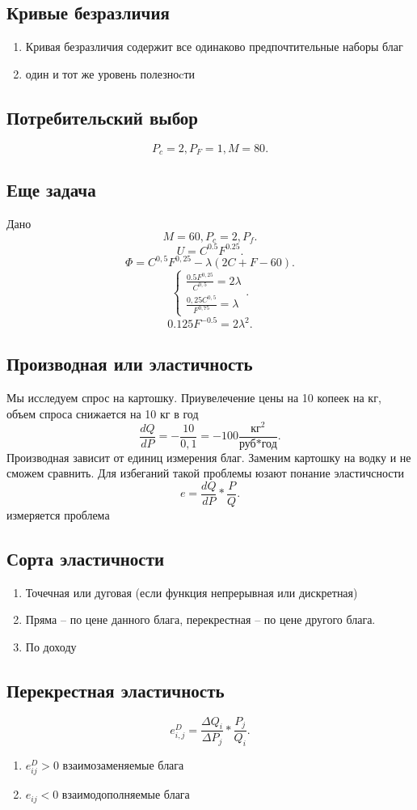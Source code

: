 \documentclass[14pt]{extarticle}
\begin{document}
\subsection{Кривые безразличия}
\begin{enumerate}
    \item Кривая безразличия содержит все одинаково предпочтительные наборы благ
    \item один и тот же уровень полезноcти
\end{enumerate}
\subsection{Потребительский выбор}
\[
P_{c} = 2, P_{F} = 1, M = 80
.\] 
\subsection{Еще задача}
Дано
\[
M = 60 , P_{c} = 2, P_{f}
.\] 
\[
U = C^{0.5}F^{0.25}
.\] 
\[
\Phi = C^{0,5} F^{0,25} - \lambda(2C +F - 60)
.\] 
\[
    \begin{cases}
        \frac{0.5 F ^{0,25}}{C^{0,5}} = 2\lambda\\
        \frac{0,25 C^{0,5}}{F^{0,75}}= \lambda
    \end{cases}
.\] 
\[
    0.125 F^{-0.5} = 2 \lambda^2
.\] 
\subsection{Производная или эластичность}
Мы исследуем спрос на картошку. Приувелечение цены на 10 копеек на кг, объем спроса снижается на 10 кг в год
\[
    \frac{dQ}{dP} = - \frac{10}{0,1} = -100 \frac{\text{кг}^2}{\text{руб}*\text{год}}
.\] 
Производная зависит от единиц измерения благ. Заменим картошку на водку и не сможем сравнить.
Для избеганий такой проблемы юзают понание эластичсности
\[
    e  = \frac{d Q}{d P} * \frac{P}{Q}
.\] 
измеряется проблема
\subsection{Сорта эластичности}
\begin{enumerate}
    \item Точечная или дуговая (если функция непрерывная или дискретная)
    \item Пряма -- по цене данного блага, перекрестная -- по цене другого блага.
    \item По доходу
\end{enumerate}
\subsection{Перекрестная эластичность}
\[
e_{i,j}^{D} = \frac{\varDelta Q_{i}}{\varDelta P_{j}} * \frac{P_{j}}{Q_{i}}
.\] 
\begin{enumerate}
    \item $e_{ij}^{D} > 0$  взаимозаменяемые блага
    \item $e_{ij} < 0$ взаимодополняемые блага
\end{enumerate}
\end{document}
